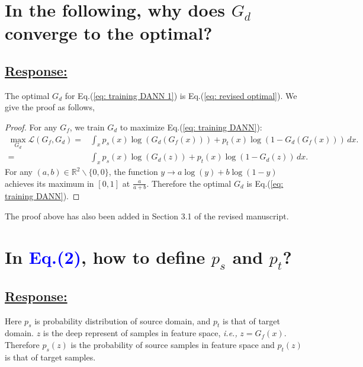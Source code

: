 \section{
    In the following, why does $G_d$ converge to the optimal? 
}

\subsection*{\underline{\textbf{Response:}}}

The optimal $G_d$ for Eq.(\ref{eq: training DANN 1}) is Eq.(\ref{eq: revised optimal}).
We give the proof as follows, 
\begin{proof}
    For any $G_f$, we train $G_d$ to maximize Eq.(\ref{eq: training DANN}):
    \begin{equation}
        \label{eq: proof optimal discriminator}
        \begin{split}
            \max_{G_d} \mathscr{L}(G_f,G_d)  = &\int_x p_s(x)\log \left(G_d\left(G_f\left(x\right)\right)\right) 
              + p_t(x) \log\left(1-G_d\left(G_f\left(x\right)\right)\right) \, dx.
            \\ = &\int_x p_s(x)\log \left(G_d\left(z\right)\right) 
              + p_t(x) \log\left(1-G_d\left(z\right)\right) \, dx.
        \end{split}
    \end{equation}
    For any $(a,b) \in \mathbb{R}^2 \backslash \{0,0\}$, the function $y \to a\log(y) + b\log(1-y)$ achieves its maximum in $[0,1]$ at $\frac{a}{a+b}$.
    Therefore the optimal $G_d$ is Eq.(\ref{eq: training DANN}).
\end{proof}

The proof above has also been added in Section 3.1 of the revised manuscript.

\section{
    In \textcolor{blue}{Eq.(2)}, how to define $p_s$ and $p_t$? 
}
\subsection*{\underline{\textbf{Response:}}}

Here $p_s$ is probability distribution of source domain, and $p_t$ is that of target domain. 
$z$ is the deep represent of samples in feature space, \textit{i.e.,} $z=G_f(x).$ 
Therefore $p_s(z)$ is the probability of source samples in feature space and $p_t (z)$ is that of target samples. 

